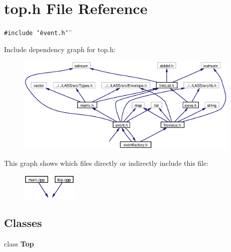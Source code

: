\section{top.h File Reference}
\label{top_8h}
{\tt \#include \char`\"{}event.h\char`\"{}}\par


Include dependency graph for top.h:\begin{figure}[H]
\begin{center}
\leavevmode
\includegraphics[width=304pt]{top_8h__incl}
\end{center}
\end{figure}


This graph shows which files directly or indirectly include this file:\begin{figure}[H]
\begin{center}
\leavevmode
\includegraphics[width=76pt]{top_8h__dep__incl}
\end{center}
\end{figure}
\subsection*{Classes}
\begin{CompactItemize}
\item 
class {\bf Top}
\end{CompactItemize}

